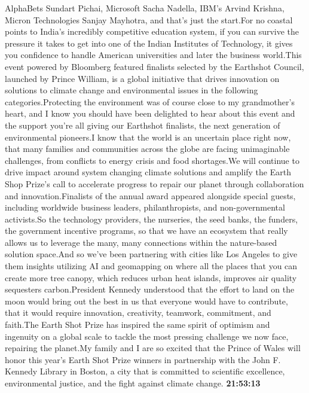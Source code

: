 \documentclass{article}%
\begin{document}
AlphaBets Sundart Pichai, Microsoft Sacha Nadella, IBM's Arvind Krishna, Micron Technologies Sanjay Mayhotra, and that's just the start.For no coastal points to India's incredibly competitive education system, if you can survive the pressure it takes to get into one of the Indian Institutes of Technology, it gives you confidence to handle American universities and later the business world.This event powered by Bloomberg featured finalists selected by the Earthshot Council, launched by Prince William, is a global initiative that drives innovation on solutions to climate change and environmental issues in the following categories.Protecting the environment was of course close to my grandmother's heart, and I know you should have been delighted to hear about this event and the support you're all giving our Earthshot finalists, the next generation of environmental pioneers.I know that the world is an uncertain place right now, that many families and communities across the globe are facing unimaginable challenges, from conflicts to energy crisis and food shortages.We will continue to drive impact around system changing climate solutions and amplify the Earth Shop Prize's call to accelerate progress to repair our planet through collaboration and innovation.Finalists of the annual award appeared alongside special guests, including worldwide business leaders, philanthropists, and non{-}governmental activists.So the technology providers, the nurseries, the seed banks, the funders, the government incentive programs, so that we have an ecosystem that really allows us to leverage the many, many connections within the nature{-}based solution space.And so we've been partnering with cities like Los Angeles to give them insights utilizing AI and geomapping on where all the places that you can create more tree canopy, which reduces urban heat islands, improves air quality sequesters carbon.President Kennedy understood that the effort to land on the moon would bring out the best in us that everyone would have to contribute, that it would require innovation, creativity, teamwork, commitment, and faith.The Earth Shot Prize has inspired the same spirit of optimism and ingenuity on a global scale to tackle the most pressing challenge we now face, repairing the planet.My family and I are so excited that the Prince of Wales will honor this year's Earth Shot Prize winners in partnership with the John F. Kennedy Library in Boston, a city that is committed to scientific excellence, environmental justice, and the fight against climate change.%
\textbf{21:53:13}%
\end{document}
